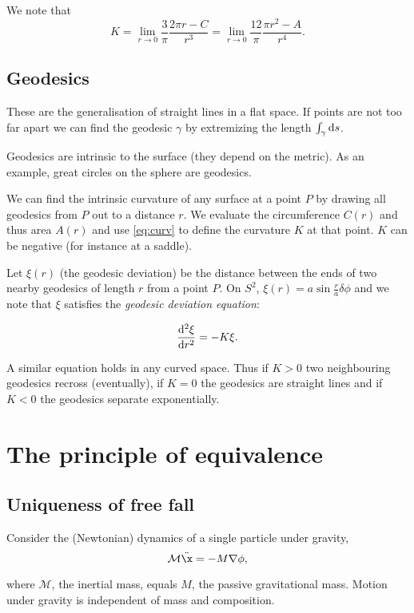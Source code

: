 \documentclass{notes}
\begin{document}
We note that
\begin{equation}\label{eq:curv}
K = \lim_{r \to 0} \frac{3}{\pi} \frac{2 \pi r - C}{r^3}
= \lim_{r \to 0} \frac{12}{\pi} \frac{\pi r^2 - A}{r^4}.
\end{equation}

\subsection{Geodesics}

These are the generalisation of straight lines in a flat space.  If
points are not too far apart we can find the geodesic $\gamma$ by
extremizing the length
$\int_\gamma \mathrm{d} s$.

Geodesics are intrinsic to the surface (they depend on the metric).
As an example, great circles on the sphere are geodesics.

We can find the intrinsic curvature of any surface at a point $P$ by
drawing all geodesics from $P$ out to a distance $r$.  We evaluate
the circumference $C(r)$ and thus area $A(r)$ and use \eqref{eq:curv}
to define the curvature $K$ at that point.  $K$ can be negative
(for instance at a saddle).

Let $\xi(r)$ (the geodesic deviation) be the distance between the ends
of two nearby geodesics of length $r$ from a point $P$.  On $S^2$,
$\xi(r) = a \sin \tfrac{r}{a} \delta \phi$ and we note that $\xi$
satisfies the \emph{geodesic deviation equation}:

\[
\frac{\mathrm{d}^2 \xi}{\mathrm{d} r^2} = - K \xi.
\]

A similar equation holds in any curved space.  Thus if $K > 0$ two
neighbouring geodesics recross (eventually), if $K = 0$ the geodesics
are straight lines and if $K < 0$ the geodesics separate exponentially.

\section{The principle of equivalence}

\subsection{Uniqueness of free fall}

Consider the (Newtonian) dynamics of a single particle under gravity,
\[
\mathcal{M} \ddot{\x} = - M \nabla \phi, 
\]

where $\mathcal{M}$, the inertial mass, equals $M$, the passive
gravitational mass.  Motion under gravity is independent of mass
and composition.
\end{document}
